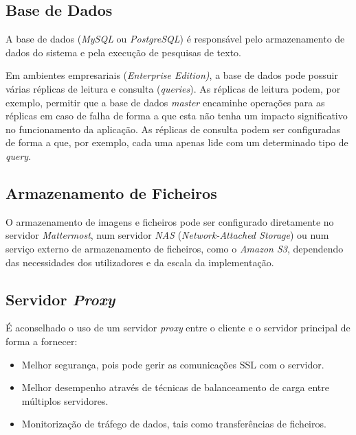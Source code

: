 \subsection{Base de Dados} \label{data-base}
A base de dados (\textit{MySQL} ou \textit{PostgreSQL}) é responsável pelo armazenamento de dados do sistema e pela execução de pesquisas de texto.
\par
Em ambientes empresariais (\textit{Enterprise Edition)}, a base de dados pode possuir várias réplicas de leitura e consulta (\textit{queries}). As réplicas de leitura podem, por exemplo, permitir que a base de dados \textit{master} encaminhe operações para as réplicas em caso de falha de forma a que esta não tenha um impacto significativo no funcionamento da aplicação. As réplicas de consulta podem ser configuradas de forma a que, por exemplo, cada uma apenas lide com um determinado tipo de \textit{query}. \cite{deployment_data_stores}
\par


\subsection{Armazenamento de Ficheiros}
O armazenamento de imagens e ficheiros pode ser configurado diretamente no servidor \textit{Mattermost}, num servidor \textit{NAS} (\textit{Network-Attached Storage}) ou num serviço externo de armazenamento de ficheiros, como o \textit{Amazon S3}, dependendo das necessidades dos utilizadores e da escala da implementação. \cite{deployment_file_store}
\par


\subsection{Servidor \textit{Proxy}} \label{servidor-proxy}
É aconselhado o uso de um servidor \textit{proxy} entre o cliente e o servidor principal de forma a fornecer:
\par

\begin{itemize}
    \item Melhor segurança, pois pode gerir as comunicações SSL com o servidor.
    \item Melhor desempenho através de técnicas de balanceamento de carga entre múltiplos servidores.
    \item Monitorização de tráfego de dados, tais como transferências de ficheiros.
\end{itemize}

